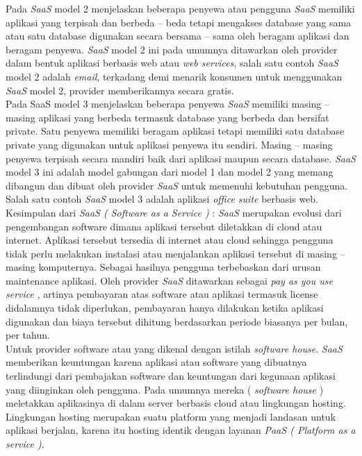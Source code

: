 \tab Pada \textit{SaaS} model 2 menjelaskan beberapa penyewa atau pengguna \textit{SaaS} memiliki aplikasi yang terpisah dan berbeda – beda tetapi mengakses database yang sama atau satu database digunakan secara bersama – sama oleh beragam aplikasi dan beragam penyewa. \textit{SaaS} model 2 ini pada umumnya ditawarkan oleh provider dalam bentuk aplikasi berbasis web atau \textit{web services}, salah satu contoh \textit{SaaS} model 2 adalah \textit{email}, terkadang demi menarik konsumen untuk menggunakan \textit{SaaS} model 2, provider memberikannya secara gratis.\\
\tab Pada SaaS model 3 menjelaskan beberapa penyewa \textit{SaaS} memiliki masing – masing aplikasi yang berbeda termasuk database yang berbeda dan bersifat private. Satu penyewa memiliki beragam aplikasi tetapi memiliki satu database private yang digunakan untuk aplikasi penyewa itu sendiri. Masing – masing penyewa terpisah secara mandiri baik dari aplikasi maupun secara database.
\textit{SaaS} model 3 ini adalah model gabungan dari model 1 dan model 2 yang memang dibangun dan dibuat oleh provider \textit{SaaS} untuk memenuhi kebutuhan pengguna. Salah satu contoh \textit{SaaS} model 3 adalah aplikasi \textit{office suite} berbasis web.\\
\tab Kesimpulan dari \textit{SaaS ( Software as a Service )} : \textit{SaaS} merupakan evolusi dari pengembangan software dimana aplikasi tersebut diletakkan di cloud atau internet. Aplikasi tersebut tersedia di internet atau cloud sehingga pengguna tidak perlu melakukan instalasi atau menjalankan aplikasi tersebut di masing – masing komputernya. Sebagai hasilnya pengguna terbebaskan dari urusan maintenance aplikasi. Oleh provider \textit{SaaS} ditawarkan sebagai \textit{pay as you use service} , artinya pembayaran atas software atau aplikasi termasuk license didalamnya tidak diperlukan, pembayaran hanya dilakukan ketika aplikasi digunakan dan biaya tersebut dihitung berdasarkan periode biasanya per bulan, per tahun.\\
\tab Untuk provider software atau yang dikenal dengan istilah \textit{software house}. \textit{SaaS} memberikan keuntungan karena aplikasi atau software yang dibuatnya terlindungi dari pembajakan software dan keuntungan dari kegunaan aplikasi yang diinginkan oleh pengguna. Pada umumnya mereka ( \textit{software house} ) meletakkan aplikasinya di dalam server berbasis cloud atau lingkungan hosting. Lingkungan hosting merupakan suatu platform yang menjadi landasan untuk aplikasi berjalan, karena itu hosting identik dengan layanan \textit{PaaS ( Platform as a service )}.\\
